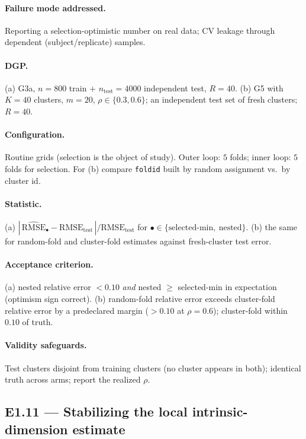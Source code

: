 \documentclass[11pt]{article}
\newcommand{\code}[1]{\texttt{#1}}
\newcommand{\rmse}{\mathrm{RMSE}}
\begin{document}
\paragraph{Failure mode addressed.} Reporting a selection-optimistic number on real data; CV
leakage through dependent (subject/replicate) samples.

\paragraph{DGP.} (a) G3a, $n=800$ train $+$ $n_{\mathrm{test}}=4000$ independent test, $R=40$.
(b) G5 with $K=40$ clusters, $m=20$, $\rho\in\{0.3,0.6\}$; an independent test set of fresh
clusters; $R=40$.

\paragraph{Configuration.} Routine grids (selection is the object of study). Outer loop: $5$
folds; inner loop: $5$ folds for selection. For (b) compare \code{foldid} built by random
assignment vs.\ by cluster id.

\paragraph{Statistic.} (a) $|\,\widehat{\rmse}_{\bullet}-\rmse_{\mathrm{test}}\,|/\rmse_{\mathrm{test}}$
for $\bullet\in\{\text{selected-min},\ \text{nested}\}$. (b) the same for random-fold and
cluster-fold estimates against fresh-cluster test error.

\paragraph{Acceptance criterion.} (a) nested relative error $<0.10$ \emph{and} nested $\ge$
selected-min in expectation (optimism sign correct). (b) random-fold relative error exceeds
cluster-fold relative error by a predeclared margin ($>0.10$ at $\rho=0.6$); cluster-fold within
$0.10$ of truth.

\paragraph{Validity safeguards.} Test clusters disjoint from training clusters (no cluster
appears in both); identical truth across arms; report the realized $\rho$.

\subsection{E1.11 — Stabilizing the local intrinsic-dimension estimate}
\end{document}
